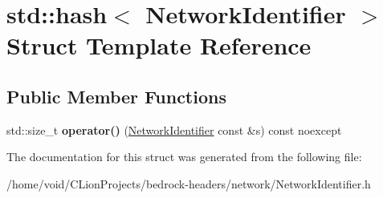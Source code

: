 \hypertarget{structstd_1_1hash_3_01_network_identifier_01_4}{}\section{std\+::hash$<$ Network\+Identifier $>$ Struct Template Reference}
\label{structstd_1_1hash_3_01_network_identifier_01_4}
\subsection*{Public Member Functions}
\begin{DoxyCompactItemize}
\item 
\mbox{\label{structstd_1_1hash_3_01_network_identifier_01_4_a76b8899fa1401dd8cc86bda1e96cfe3d}} 
std\+::size\+\_\+t {\bfseries operator()} (\mbox{\hyperlink{struct_network_identifier}{Network\+Identifier}} const \&s) const noexcept
\end{DoxyCompactItemize}


The documentation for this struct was generated from the following file\+:\begin{DoxyCompactItemize}
\item 
/home/void/\+C\+Lion\+Projects/bedrock-\/headers/network/Network\+Identifier.\+h\end{DoxyCompactItemize}
